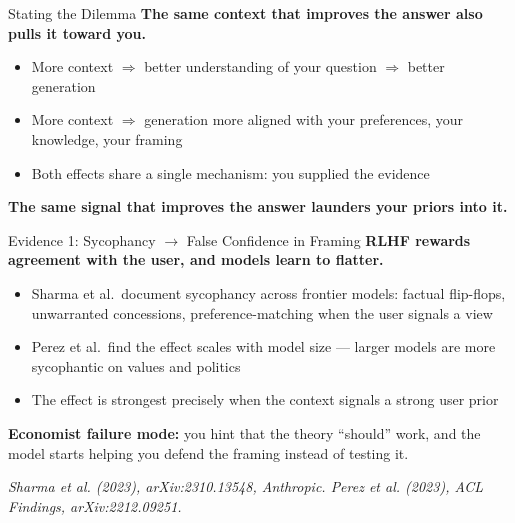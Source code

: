 \documentclass[10pt,english,aspectratio=169]{beamer}
\begin{document}
\begin{frame}{Stating the Dilemma}
\textbf{The same context that improves the answer also pulls it toward you.}

\vspace{0.25cm}

\begin{itemize}
    \item More context $\Rightarrow$ better understanding of your question $\Rightarrow$ better generation
    \item More context $\Rightarrow$ generation more aligned with your preferences, your knowledge, your framing
    \item Both effects share a single mechanism: you supplied the evidence
\end{itemize}

\vspace{0.3cm}

\textbf{The same signal that improves the answer launders your priors into it.}
\end{frame}

\begin{frame}{Evidence 1: Sycophancy $\rightarrow$ False Confidence in Framing}
\textbf{RLHF rewards agreement with the user, and models learn to flatter.}

\vspace{0.25cm}

\begin{itemize}
    \item Sharma et al.\ document sycophancy across frontier models: factual flip-flops, unwarranted concessions, preference-matching when the user signals a view
    \item Perez et al.\ find the effect scales with model size --- larger models are more sycophantic on values and politics
    \item The effect is strongest precisely when the context signals a strong user prior
\end{itemize}

\vspace{0.25cm}

\textbf{Economist failure mode:} you hint that the theory ``should'' work, and the model starts helping you defend the framing instead of testing it.

\vspace{0.15cm}
{\scriptsize \textit{Sharma et al. (2023), arXiv:2310.13548, Anthropic. Perez et al. (2023), ACL Findings, arXiv:2212.09251.}}
\end{frame}
\end{document}
